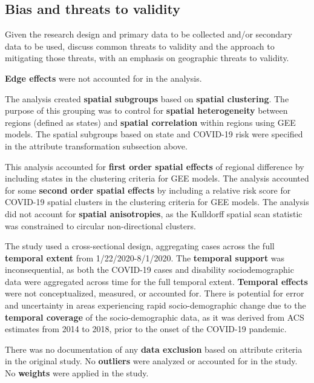 \documentclass[
]{article}
\begin{document}
\hypertarget{bias-and-threats-to-validity}{%
\subsection{Bias and threats to
validity}\label{bias-and-threats-to-validity}}

Given the research design and primary data to be collected and/or
secondary data to be used, discuss common threats to validity and the
approach to mitigating those threats, with an emphasis on geographic
threats to validity.

\textbf{Edge effects} were not accounted for in the analysis.

The analysis created \textbf{spatial subgroups} based on \textbf{spatial
clustering}. The purpose of this grouping was to control for
\textbf{spatial heterogeneity} between regions (defined as states) and
\textbf{spatial correlation} within regions using GEE models. The
spatial subgroups based on state and COVID-19 risk were specified in the
attribute transformation subsection above.

This analysis accounted for \textbf{first order spatial effects} of
regional difference by including states in the clustering criteria for
GEE models. The analysis accounted for some \textbf{second order spatial
effects} by including a relative risk score for COVID-19 spatial
clusters in the clustering criteria for GEE models. The analysis did not
account for \textbf{spatial anisotropies}, as the Kulldorff spatial scan
statistic was constrained to circular non-directional clusters.

The study used a cross-sectional design, aggregating cases across the
full \textbf{temporal extent} from 1/22/2020-8/1/2020. The
\textbf{temporal support} was inconsequential, as both the COVID-19
cases and disability sociodemographic data were aggregated across time
for the full temporal extent. \textbf{Temporal effects} were not
conceptualized, measured, or accounted for. There is potential for error
and uncertainty in areas experiencing rapid socio-demographic change due
to the \textbf{temporal coverage} of the socio-demographic data, as it
was derived from ACS estimates from 2014 to 2018, prior to the onset of
the COVID-19 pandemic.

There was no documentation of any \textbf{data exclusion} based on
attribute criteria in the original study. No \textbf{outliers} were
analyzed or accounted for in the study. No \textbf{weights} were applied
in the study.
\end{document}
